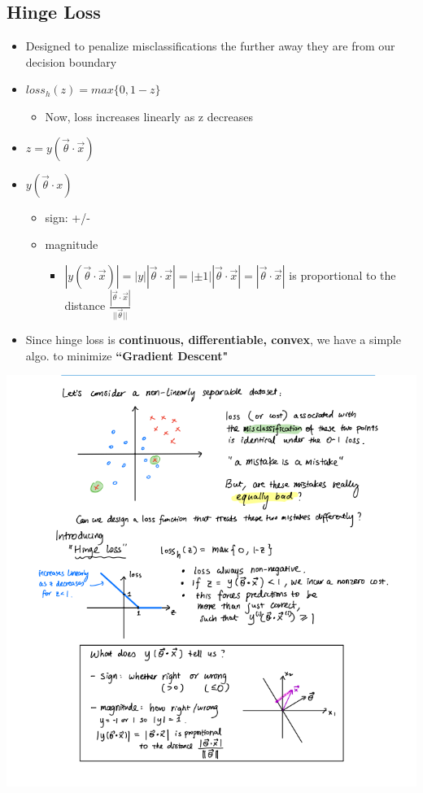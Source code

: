 \documentclass[10pt, oneside]{article}
\begin{document}
\subsection{Hinge Loss}
\begin{itemize}
    \item Designed to penalize misclassifications the further away they are from our decision boundary
    \item $loss_h (z) = max\{0,1-z\}$
    \begin{itemize}
        \item Now, loss increases linearly as z decreases
    \end{itemize}
    \item $z=y(\vec \theta \cdot \vec x)$
    \item $y(\vec \theta\cdot x)$
    \begin{itemize}
        \item sign: +/-
        \item magnitude
        \begin{itemize}
            \item $|y(\vec \theta\cdot \vec x)|=|y||\vec\theta\cdot \vec x|= |\pm 1| |\vec \theta\cdot \vec x| = |\vec \theta\cdot \vec x|$ is proportional to the distance $\frac{|\vec \theta \cdot \vec x|}{||\vec \theta||}$
        \end{itemize}
    \end{itemize}
    \item Since hinge loss is \textbf{continuous, differentiable, convex}, we have a simple algo. to minimize \textbf{``Gradient Descent"}
\end{itemize}
\includegraphics[scale=0.9]{Images/hinge_loss.png}
\end{document}
